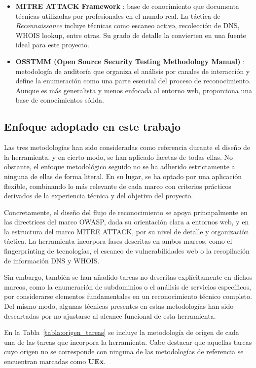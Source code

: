 \begin{parskipenv}
\begin{itemize}
  \item \textbf{MITRE ATTACK Framework} \cite{mitreMethodology}: base de conocimiento que documenta técnicas utilizadas por profesionales en el mundo real. La táctica de \textit{Reconnaissance} incluye técnicas como escaneo activo, recolección de DNS, WHOIS lookup, entre otras. Su grado de detalle la convierten en una fuente ideal para este proyecto.

  \item \textbf{OSSTMM (Open Source Security Testing Methodology Manual)} \cite{osstmmMethodology}: metodología de auditoría que organiza el análisis por canales de interacción y define la enumeración como una parte esencial del proceso de reconocimiento. Aunque es más generalista y menos enfocada al entorno web, proporciona una base de conocimientos sólida.
\end{itemize}

\subsection{Enfoque adoptado en este trabajo}
Las tres metodologías han sido consideradas como referencia durante el diseño de la herramienta, y en cierto modo, se han aplicado facetas de todas ellas. No obstante, el enfoque metodológico seguido no se ha adherido estrictamente a ninguna de ellas de forma literal. En su lugar, se ha optado por una aplicación flexible, combinando lo más relevante de cada marco con criterios prácticos derivados de la experiencia técnica y del objetivo del proyecto.

Concretamente, el diseño del flujo de reconocimiento se apoya principalmente en las directrices del marco OWASP, dada su orientación clara a entornos web, y en la estructura del marco MITRE ATTACK, por su nivel de detalle y organización táctica. La herramienta incorpora fases descritas en ambos marcos, como el fingerprinting de tecnologías, el escaneo de vulnerabilidades web o la recopilación de información DNS y WHOIS.

Sin embargo, también se han añadido tareas no descritas explícitamente en dichos marcos, como la enumeración de subdominios o el análisis de servicios específicos, por considerarse elementos fundamentales en un reconocimiento técnico completo. Del mismo modo, algunas técnicas presentes en estas metodologías han sido descartadas por no ajustarse al alcance funcional de esta herramienta.

En la Tabla~\ref{tabla:origen_tareas} se incluye la metodología de origen de cada una de las tareas que incorpora la herramienta. Cabe destacar que aquellas tareas cuyo origen no se corresponde con ninguna de las metodologías de referencia se encuentran marcadas como \textbf{UEx}.


\end{parskipenv}
